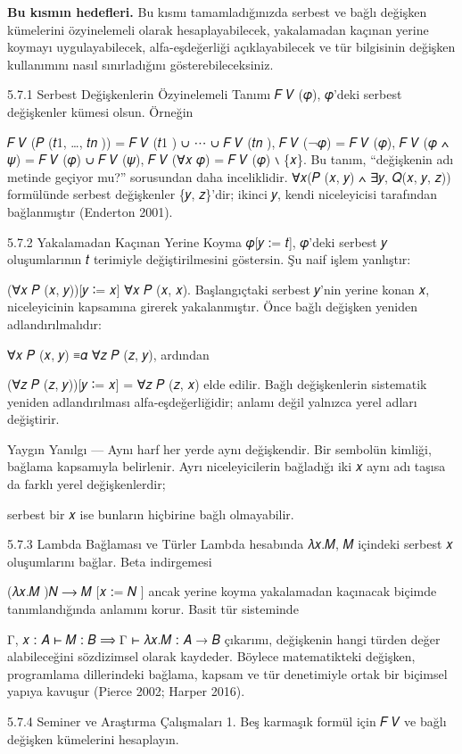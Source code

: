 \textbf{Bu kısmın hedefleri.} Bu kısmı tamamladığınızda serbest ve bağlı değişken kümelerini özyinelemeli olarak hesaplayabilecek, yakalamadan kaçınan yerine koymayı uygulayabilecek, alfa-eşdeğerliği açıklayabilecek ve tür bilgisinin değişken kullanımını nasıl sınırladığını gösterebileceksiniz.


5.7.1 Serbest Değişkenlerin Özyinelemeli Tanımı 𝐹 𝑉 (𝜑), 𝜑’deki serbest değişkenler kümesi olsun. Örneğin

𝐹 𝑉 (𝑃 (𝑡1, …, 𝑡𝑛 )) = 𝐹 𝑉 (𝑡1 ) ∪ ⋯ ∪ 𝐹 𝑉 (𝑡𝑛 ), 𝐹 𝑉 (¬𝜑) = 𝐹 𝑉 (𝜑), 𝐹 𝑉 (𝜑 ∧ 𝜓) = 𝐹 𝑉 (𝜑) ∪ 𝐹 𝑉 (𝜓), 𝐹 𝑉 (∀𝑥 𝜑) = 𝐹 𝑉 (𝜑) ∖ \{𝑥\}. Bu tanım, “değişkenin adı metinde geçiyor mu?” sorusundan daha inceliklidir. ∀𝑥(𝑃 (𝑥, 𝑦) ∧ ∃𝑦, 𝑄(𝑥, 𝑦, 𝑧)) formülünde serbest değişkenler \{𝑦, 𝑧\}’dir; ikinci 𝑦, kendi niceleyicisi tarafından bağlanmıştır (Enderton 2001).

5.7.2 Yakalamadan Kaçınan Yerine Koyma 𝜑[𝑦 ∶= 𝑡], 𝜑’deki serbest 𝑦 oluşumlarının 𝑡 terimiyle değiştirilmesini göstersin. Şu naif işlem yanlıştır:

(∀𝑥 𝑃 (𝑥, 𝑦))[𝑦 ∶= 𝑥]          ∀𝑥 𝑃 (𝑥, 𝑥). Başlangıçtaki serbest 𝑦’nin yerine konan 𝑥, niceleyicinin kapsamına girerek yakalanmıştır. Önce bağlı değişken yeniden adlandırılmalıdır:

∀𝑥 𝑃 (𝑥, 𝑦) ≡𝛼 ∀𝑧 𝑃 (𝑧, 𝑦), ardından

(∀𝑧 𝑃 (𝑧, 𝑦))[𝑦 ∶= 𝑥] = ∀𝑧 𝑃 (𝑧, 𝑥) elde edilir. Bağlı değişkenlerin sistematik yeniden adlandırılması alfa-eşdeğerliğidir; anlamı değil yalnızca yerel adları değiştirir.

Yaygın Yanılgı — Aynı harf her yerde aynı değişkendir. Bir sembolün kimliği, bağlama kapsamıyla belirlenir. Ayrı niceleyicilerin bağladığı iki 𝑥 aynı adı taşısa da farklı yerel değişkenlerdir;

serbest bir 𝑥 ise bunların hiçbirine bağlı olmayabilir.

5.7.3 Lambda Bağlaması ve Türler Lambda hesabında 𝜆𝑥.𝑀, 𝑀 içindeki serbest 𝑥 oluşumlarını bağlar. Beta indirgemesi

(𝜆𝑥.𝑀 )𝑁 ⟶ 𝑀 [𝑥 ∶= 𝑁 ] ancak yerine koyma yakalamadan kaçınacak biçimde tanımlandığında anlamını korur. Basit tür sisteminde

Γ, 𝑥 ∶ 𝐴 ⊢ 𝑀 ∶ 𝐵        ⟹   Γ ⊢ 𝜆𝑥.𝑀 ∶ 𝐴 → 𝐵 çıkarımı, değişkenin hangi türden değer alabileceğini sözdizimsel olarak kaydeder. Böylece matematikteki değişken, programlama dillerindeki bağlama, kapsam ve tür denetimiyle ortak bir biçimsel yapıya kavuşur (Pierce 2002; Harper 2016).

5.7.4 Seminer ve Araştırma Çalışmaları 1. Beş karmaşık formül için 𝐹 𝑉 ve bağlı değişken kümelerini hesaplayın.

